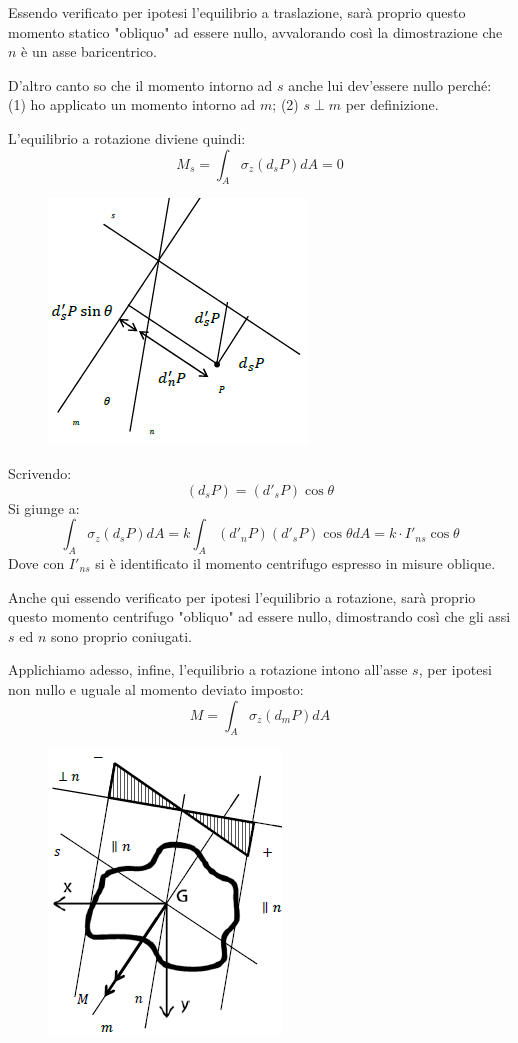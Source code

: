 		Essendo verificato per ipotesi l'equilibrio a traslazione, sarà proprio questo momento statico "obliquo" ad essere nullo, avvalorando così la dimostrazione che $n$ è un asse baricentrico. \newline 
		
		D'altro canto so che il momento intorno ad $s$ anche lui dev'essere nullo perché: (1) ho applicato un momento intorno ad $m$; (2) $s \perp m$ per definizione. 
		
		L'equilibrio a rotazione diviene quindi: 
		\[ M_s = \int_A\sigma_z(d_sP)dA = 0 \]
		
\begin{figure}[H]
	\centering
	\includegraphics[width=0.5\linewidth]{immagini_4/screenshot004}
	\label{fig:screenshot004}
\end{figure}

		Scrivendo:
		\[(d_sP) = (d'_sP)\cos\theta\]
		Si giunge a:
		\[ \int_A\sigma_z(d_sP)dA = k\int_A(d'_nP)(d'_sP)\cos\theta dA = k \cdot I'_{ns}\cos\theta\]
		Dove con $I'_{ns}$ si è identificato il momento centrifugo espresso in misure oblique.
		
		Anche qui essendo verificato per ipotesi l'equilibrio a rotazione, sarà proprio questo momento centrifugo "obliquo" ad essere nullo, dimostrando così che gli assi $s$ ed $n$ sono proprio coniugati. \newline 
		
		Applichiamo adesso, infine, l'equilibrio a rotazione intono all'asse $s$, per ipotesi non nullo e uguale al momento deviato imposto: 
		\[M = \int_A\sigma_z(d_mP)dA \]
		
\begin{figure}[H]
	\centering
	\includegraphics[width=0.4\linewidth]{immagini_4/screenshot005}
	\label{fig:screenshot005}
\end{figure}


